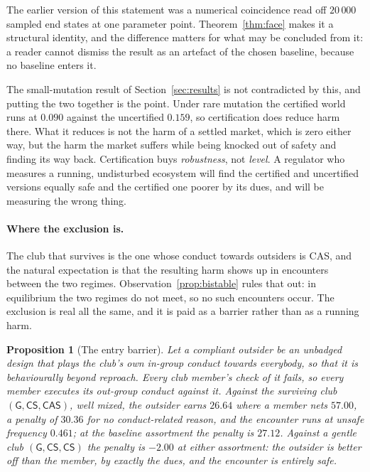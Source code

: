 \documentclass[preprint,12pt]{elsarticle}
\theoremstyle{plain}
\newtheorem{proposition}[theorem]{Proposition}
\theoremstyle{definition}
\newcommand{\CS}{\textsf{CS}}
\newcommand{\CAS}{\textsf{CAS}}
\begin{document}
The earlier version of this statement was a numerical coincidence read off
$20\,000$ sampled end states at one parameter point. Theorem~\ref{thm:face}
makes it a structural identity, and the difference matters for what may be
concluded from it: a reader cannot dismiss the result as an artefact of the
chosen baseline, because no baseline enters it.

The small-mutation result of Section~\ref{sec:results} is not contradicted by
this, and putting the two together is the point. Under rare mutation the
certified world runs at $0.090$ against the uncertified $0.159$, so
certification does reduce harm there. What it reduces is not the harm of a
settled market, which is zero either way, but the harm the market suffers while
being knocked out of safety and finding its way back. Certification buys
\emph{robustness}, not \emph{level}. A regulator who measures a running,
undisturbed ecosystem will find the certified and uncertified versions equally
safe and the certified one poorer by its dues, and will be measuring the wrong
thing.

\paragraph{Where the exclusion is.}
The club that survives is the one whose conduct towards outsiders is \CAS{},
and the natural expectation is that the resulting harm shows up in encounters
between the two regimes. Observation~\ref{prop:bistable} rules that out: in
equilibrium the two regimes do not meet, so no such encounters occur. The
exclusion is real all the same, and it is paid as a barrier rather than as a
running harm.

\begin{proposition}[The entry barrier]
\label{prop:exclusion}
Let a compliant outsider be an unbadged design that plays the club's own
in-group conduct towards everybody, so that it is behaviourally beyond
reproach. Every club member's check of it fails, so every member executes its
out-group conduct against it. Against the surviving club
$(\mathsf{G}, \CS, \CAS)$, well mixed, the outsider earns $26.64$ where a member
nets $57.00$, a penalty of $30.36$ for no conduct-related reason, and the
encounter runs at unsafe frequency $0.461$; at the baseline assortment the
penalty is $27.12$. Against a gentle club
$(\mathsf{G}, \CS, \CS)$ the penalty is $-2.00$ at either assortment: the
outsider is \emph{better off} than the member, by exactly the dues, and the
encounter is entirely safe.
\end{proposition}
\end{document}
